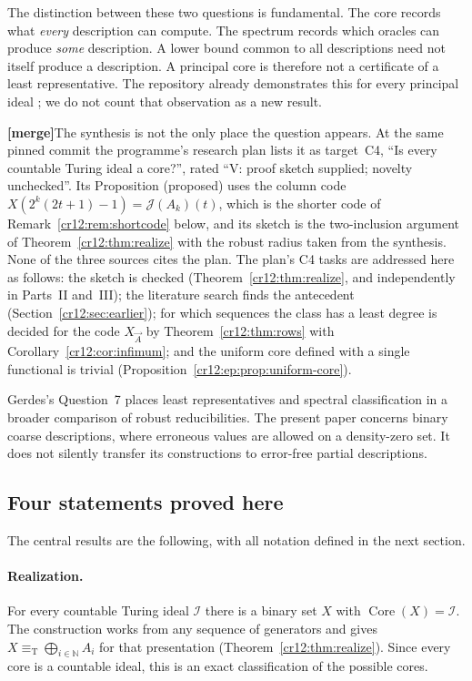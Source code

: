 \documentclass[11pt,letterpaper]{article}
\theoremstyle{plain}
\theoremstyle{definition}
\theoremstyle{remark}
\numberwithin{equation}{section}
\newcommand{\N}{\mathbb N}
\newcommand{\eqT}{\equiv_{\mathrm T}}
\newcommand{\Core}{\operatorname{Core}}
\newcommand{\Jcode}{\mathcal J}
\newcommand{\I}{\mathcal I}
\newcommand{\joinvec}{\bigoplus_{i\in\N}}
\newcommand{\mergenote}[1]{\par\smallskip\noindent
 {\small\textsf{\textbf{[merge]}}\enspace #1}\par\smallskip}
\begin{document}
The distinction between these two questions is fundamental. The core records
what \emph{every} description can compute. The spectrum records which oracles
can produce \emph{some} description. A lower bound common to all descriptions
need not itself produce a description. A principal core is therefore not a
certificate of a least representative. The repository already demonstrates
this for every principal ideal \cite{Repo}; we do not count that observation as
a new result.

\mergenote{The synthesis is not the only place the question appears. At the same
pinned commit the programme's research plan \cite{Plan} lists it as target~C4,
``Is every countable Turing ideal a core?'', rated ``V: proof sketch supplied;
novelty unchecked''. Its Proposition (proposed) uses the column code
$X(2^k(2t+1)-1)=\Jcode(A_k)(t)$, which is the shorter code of
Remark~\ref{cr12:rem:shortcode} below, and its sketch is the two-inclusion argument
of Theorem~\ref{cr12:thm:realize} with the robust radius taken from the synthesis.
None of the three sources cites the plan. The plan's C4 tasks are addressed here
as follows: the sketch is checked (Theorem~\ref{cr12:thm:realize}, and
independently in Parts~II and~III); the literature search finds the antecedent
\cite[Lemma~3.10 and Theorem~3.11]{HJS} (Section~\ref{cr12:sec:earlier}); for which
sequences the class has a least degree is decided for the code $X_{\vec A}$ by
Theorem~\ref{cr12:thm:rows} with Corollary~\ref{cr12:cor:infimum}; and the uniform core
defined with a single functional is trivial
(Proposition~\ref{cr12:ep:prop:uniform-core}).}

Gerdes's Question~7 \cite{Gerdes} places least representatives and spectral
classification in a broader comparison of robust reducibilities. The present
paper concerns binary coarse descriptions, where erroneous values are allowed
on a density-zero set. It does not silently transfer its constructions to
error-free partial descriptions.

\subsection{Four statements proved here}
The central results are the following, with all notation defined in the next
section.

\paragraph{Realization.}
For every countable Turing ideal $\I$ there is a binary set $X$ with
$\Core(X)=\I$. The construction works from any sequence of generators and gives
$X\eqT\joinvec A_i$ for that presentation
(Theorem~\ref{cr12:thm:realize}). Since every core is a countable ideal, this is an
exact classification of the possible cores.
\end{document}
